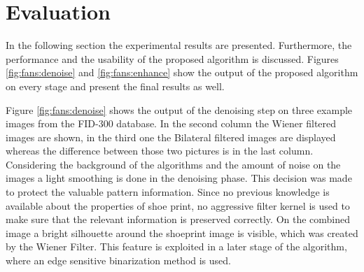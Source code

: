 \documentclass[draft,final]{vutinfth} %
\begin{document}
\section{Evaluation}
\par
In the following section the experimental results are presented.
Furthermore, the performance and the usability of the proposed algorithm is discussed.
Figures \ref{fig:fans:denoise} and \ref{fig:fans:enhance} show the output of the proposed algorithm on every stage and present the final results as well.
\par
Figure \ref{fig:fans:denoise} shows the output of the denoising step on three example images from the FID-300 database.
In the second column the Wiener filtered images are shown, in the third one the Bilateral filtered images are displayed whereas the difference between those two pictures is in the last column.
Considering the background of the algorithms and the amount of noise on the images a light smoothing is done in the denoising phase.
This decision was made to protect the valuable pattern information.
Since no previous knowledge is available about the properties of shoe print, no aggressive filter kernel is used to make sure that the relevant information is preserved correctly.
On the combined image a bright silhouette around the shoeprint image is visible, which was created by the Wiener Filter.
This feature is exploited in a later stage of the algorithm, where an edge sensitive binarization method is used.
\end{document}
